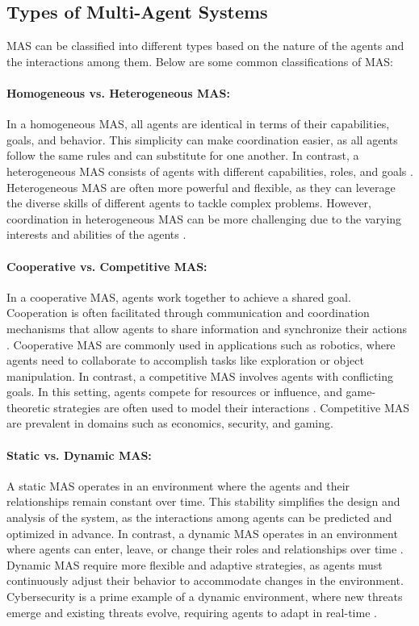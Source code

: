 \subsection{Types of Multi-Agent Systems}

MAS can be classified into different types based on the nature of the agents and the interactions among them. Below are some common classifications of MAS:

\paragraph{Homogeneous vs. Heterogeneous MAS:}
In a homogeneous MAS, all agents are identical in terms of their capabilities, goals, and behavior. This simplicity can make coordination easier, as all agents follow the same rules and can substitute for one another. In contrast, a heterogeneous MAS consists of agents with different capabilities, roles, and goals \cite{balaji2010introduction}. Heterogeneous MAS are often more powerful and flexible, as they can leverage the diverse skills of different agents to tackle complex problems. However, coordination in heterogeneous MAS can be more challenging due to the varying interests and abilities of the agents \cite{shoham2008multiagent}.

\paragraph{Cooperative vs. Competitive MAS:}
In a cooperative MAS, agents work together to achieve a shared goal. Cooperation is often facilitated through communication and coordination mechanisms that allow agents to share information and synchronize their actions \cite{falco2020tendencies}. Cooperative MAS are commonly used in applications such as robotics, where agents need to collaborate to accomplish tasks like exploration or object manipulation. In contrast, a competitive MAS involves agents with conflicting goals. In this setting, agents compete for resources or influence, and game-theoretic strategies are often used to model their interactions \cite{shoham2008multiagent}. Competitive MAS are prevalent in domains such as economics, security, and gaming.

\paragraph{Static vs. Dynamic MAS:}
A static MAS operates in an environment where the agents and their relationships remain constant over time. This stability simplifies the design and analysis of the system, as the interactions among agents can be predicted and optimized in advance. In contrast, a dynamic MAS operates in an environment where agents can enter, leave, or change their roles and relationships over time \cite{dorri2018multiagent}. Dynamic MAS require more flexible and adaptive strategies, as agents must continuously adjust their behavior to accommodate changes in the environment. Cybersecurity is a prime example of a dynamic environment, where new threats emerge and existing threats evolve, requiring agents to adapt in real-time \cite{dorri2018multiagent}.

